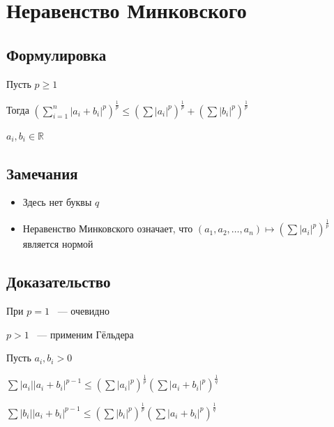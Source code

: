\documentclass{article}
\begin{document}
    \section{Неравенство Минковского}
    
        \subsection{Формулировка}
        
            Пусть $p \geq 1$
            
            Тогда $\left( \sum\limits_{i = 1}^n |a_i + b_i|^p\right)^{\frac{1}{p}} \leq \left( \sum |a_i|^p \right)^{\frac{1}{p}} + \left( \sum |b_i|^p \right)^{\frac{1}{p}}$
            
            $a_i, b_i \in \mathbb{R}$
            
        \subsection{Замечания}
        
            \begin{itemize}
            
                \item Здесь нет буквы $q$
                
                \item Неравенство Минковского означает, что $(a_1, a_2, \ldots, a_n) \mapsto \left( \sum |a_i|^p \right)^{\frac{1}{p}}$ является нормой
                
            \end{itemize}

        \subsection{Доказательство}
        
            При $p = 1$ ~--- очевидно
            
            $p > 1$ ~--- применим Гёльдера
            
            Пусть $a_i, b_i > 0$
            
            $\sum |a_i| |a_i + b_i|^{p - 1} \leq \left( \sum |a_i|^p \right)^{\frac{1}{p}} \left( \sum |a_i + b_i|^p \right)^{\frac{1}{q}}$
            
            $\sum |b_i| |a_i + b_i|^{p - 1} \leq \left( \sum |b_i|^p \right)^{\frac{1}{p}} \left( \sum |a_i + b_i|^p \right)^{\frac{1}{q}}$
            
\end{document}

